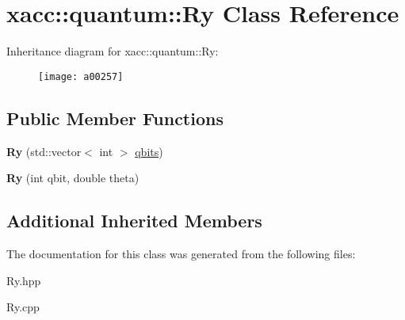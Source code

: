 \hypertarget{a00257}{}\section{xacc\+:\+:quantum\+:\+:Ry Class Reference}
\label{a00257}
Inheritance diagram for xacc\+:\+:quantum\+:\+:Ry\+:\begin{figure}[H]
\begin{center}
\leavevmode
\texttt{[image: a00257]}
\end{center}
\end{figure}
\subsection*{Public Member Functions}
\begin{DoxyCompactItemize}
\item 
{\bfseries Ry} (std\+::vector$<$ int $>$ \hyperlink{a00112_a2a56be6c2519ea65df4d06f4abae1393}{qbits})\hypertarget{a00257_a542e1c0576a8e784f6cece4c77598486}{}\label{a00257_a542e1c0576a8e784f6cece4c77598486}

\item 
{\bfseries Ry} (int qbit, double theta)\hypertarget{a00257_a1cb81fe622168ba8d79fa2a78b5b0006}{}\label{a00257_a1cb81fe622168ba8d79fa2a78b5b0006}

\end{DoxyCompactItemize}
\subsection*{Additional Inherited Members}


The documentation for this class was generated from the following files\+:\begin{DoxyCompactItemize}
\item 
Ry.\+hpp\item 
Ry.\+cpp\end{DoxyCompactItemize}
